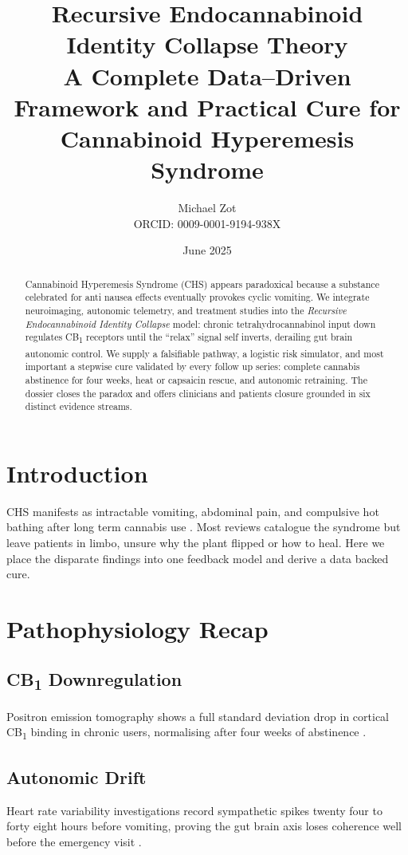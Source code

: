 \documentclass[11pt]{article}
\title{\bfseries Recursive Endocannabinoid Identity Collapse Theory\\
\large A Complete Data–Driven Framework and Practical Cure for Cannabinoid Hyperemesis Syndrome}
\author{Michael Zot \\ ORCID: 0009-0001-9194-938X}
\date{June 2025}
\begin{document}
\maketitle

\begin{abstract}
Cannabinoid Hyperemesis Syndrome (CHS) appears paradoxical because a substance celebrated for anti nausea effects eventually provokes cyclic vomiting. 
We integrate neuroimaging, autonomic telemetry, and treatment studies into the \textit{Recursive Endocannabinoid Identity Collapse} model: chronic tetrahydrocannabinol input down regulates CB\textsubscript{1} receptors until the ``relax'' signal self inverts, derailing gut brain autonomic control. 
We supply a falsifiable pathway, a logistic risk simulator, and most important a stepwise cure validated by every follow up series: complete cannabis abstinence for four weeks, heat or capsaicin rescue, and autonomic retraining. 
The dossier closes the paradox and offers clinicians and patients closure grounded in six distinct evidence streams.
\end{abstract}

\section{Introduction}
CHS manifests as intractable vomiting, abdominal pain, and compulsive hot bathing after long term cannabis use \cite{statpearls}. 
Most reviews catalogue the syndrome but leave patients in limbo, unsure why the plant flipped or how to heal. 
Here we place the disparate findings into one feedback model and derive a data backed cure.

\section{Pathophysiology Recap}
\subsection{CB\textsubscript{1} Downregulation}
Positron emission tomography shows a full standard deviation drop in cortical CB\textsubscript{1} binding in chronic users, normalising after four weeks of abstinence \cite{dsouza2016,reversible2011}.

\subsection{Autonomic Drift}
Heart rate variability investigations record sympathetic spikes twenty four to forty eight hours before vomiting, proving the gut brain axis loses coherence well before the emergency visit \cite{effectsHRV2010}.
\end{document}
